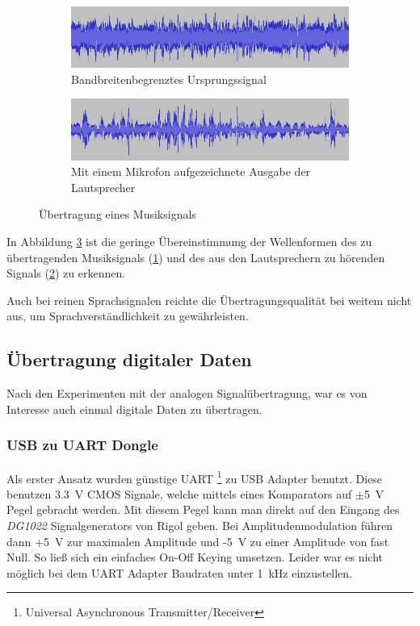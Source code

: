 \documentclass[12pt,a4paper]{article}
\begin{document}
\begin{figure}[H]
  \centering
  \begin{subfigure}[b]{1.0\textwidth}
    \includegraphics[width=\textwidth]{../audacity_sent.png}
    \caption{Bandbreitenbegrenztes Ursprungssignal}
    \label{fig:audacity_sent}
  \end{subfigure}  
  \begin{subfigure}[b]{1.0\textwidth}
    \includegraphics[width=\textwidth]{../audacity_received.png}
    \caption{Mit einem Mikrofon aufgezeichnete Ausgabe der Lautsprecher}
    \label{fig:audacity_received}
  \end{subfigure}  
  \caption{Übertragung eines Musiksignals}
  \label{fig:audacity}
\end{figure}

In Abbildung \ref{fig:audacity} ist die geringe Übereinstimmung der Wellenformen des zu übertragenden Musiksignals (\ref{fig:audacity_sent}) und des aus den Lautsprechern zu hörenden Signals (\ref{fig:audacity_received}) zu erkennen.

Auch bei reinen Sprachsignalen reichte die Übertragungsqualität bei weitem nicht aus, um Sprachverständlichkeit zu gewährleisten.

\subsection{Übertragung digitaler Daten}
Nach den Experimenten mit der analogen Signalübertragung, war es von Interesse auch einmal digitale Daten zu übertragen.

\subsubsection{USB zu UART Dongle}
Als erster Ansatz wurden günstige UART \footnote{Universal Asynchronous Transmitter/Receiver} zu USB Adapter benutzt. Diese benutzen \SI{3.3}{\volt}  CMOS Signale, welche mittels eines Komparators auf $\pm$\SI{5}{\volt} Pegel gebracht werden. Mit diesem Pegel kann man direkt auf den Eingang des \textit{DG1022} Signalgenerators von Rigol geben. Bei Amplitudenmodulation führen dann +\SI{5}{\volt} zur maximalen Amplitude und -\SI{5}{\volt}  zu einer Amplitude von fast Null. So ließ sich ein einfaches On-Off Keying umsetzen. Leider war es nicht möglich bei dem UART Adapter Baudraten unter \SI{1}{\kilo\hertz} einzustellen.
\end{document}
